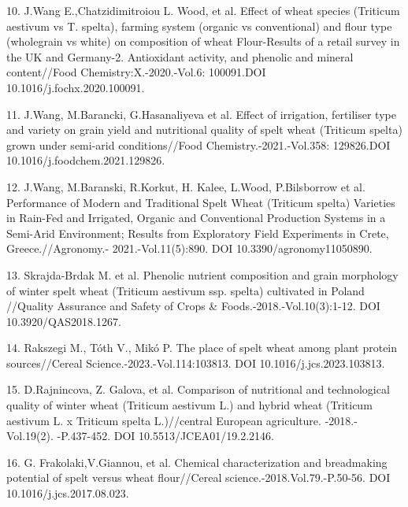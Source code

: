 \begin{refs}
10. J.Wang E.,Chatzidimitroiou L. Wood, et al. Effect of wheat species
(Triticum aestivum vs T. spelta), farming system (organic vs
conventional) and flour type (wholegrain vs white) on composition of
wheat Flour-Results of a retail survey in the UK and Germany-2.
Antioxidant activity, and phenolic and mineral content//Food
Chemistry:X.-2020.-Vol.6: 100091.DOI 10.1016/j.fochx.2020.100091.

11. J.Wang, M.Barancki, G.Hasanaliyeva et al. Effect of irrigation,
fertiliser type and variety on grain yield and nutritional quality of
spelt wheat (Triticum spelta) grown under semi-arid conditions//Food
Chemistry.-2021.-Vol.358: 129826.DOI 10.1016/j.foodchem.2021.129826.

12. J.Wang, M.Baranski, R.Korkut, H. Kalee, L.Wood, P.Bilsborrow et al.
Performance of Modern and Traditional Spelt Wheat (Triticum spelta)
Varieties in Rain-Fed and Irrigated, Organic and Conventional Production
Systems in a Semi-Arid Environment; Results from Exploratory Field
Experiments in Crete, Greece.//Agronomy.- 2021.-Vol.11(5):890. DOI
10.3390/agronomy11050890.

13. Skrajda-Brdak M. et al. Phenolic nutrient composition and grain
morphology of winter spelt wheat (Triticum aestivum ssp. spelta)
cultivated in Poland //Quality Assurance and Safety of Crops \&
Foods.-2018.-Vol.10(3):1-12. DOI 10.3920/QAS2018.1267.

14. Rakszegi M., Tóth V., Mikó P. The place of spelt wheat among plant
protein sources//Cereal Science.-2023.-Vol.114:103813. DOI
10.1016/j.jcs.2023.103813.

15. D.Rajnincova, Z. Galova, et al. Comparison of nutritional and
technological quality of winter wheat (Triticum aestivum L.) and hybrid
wheat (Triticum aestivum L. x Triticum spelta L.)//central European
agriculture. -2018.-Vol.19(2). -P.437-452. DOI 10.5513/JCEA01/19.2.2146.

16. G. Frakolaki,V.Giannou, et al. Chemical characterization and
breadmaking potential of spelt versus wheat flour//Cereal
science.-2018.Vol.79.-P.50-56. DOI 10.1016/j.jcs.2017.08.023.
\end{refs}

